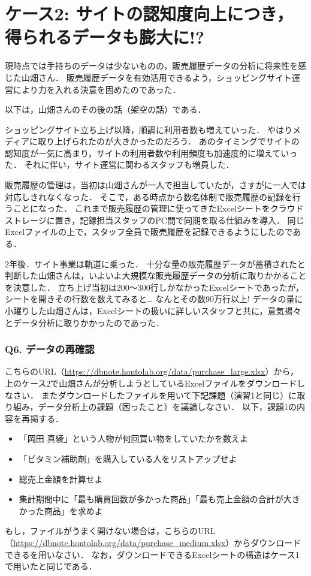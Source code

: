 \section{ケース2: サイトの認知度向上につき，得られるデータも膨大に!?}
現時点では手持ちのデータは少ないものの，販売履歴データの分析に将来性を感じた山畑さん．
販売履歴データを有効活用できるよう，ショッピングサイト運営により力を入れる決意を固めたのであった．

以下は，山畑さんのその後の話（架空の話）である．

\begin{framed}
ショッピングサイト立ち上げ以降，順調に利用者数も増えていった．
やはりメディアに取り上げられたのが大きかったのだろう．
あのタイミングでサイトの認知度が一気に高まり，サイトの利用者数や利用頻度も加速度的に増えていった．
それに伴い，サイト運営に関わるスタッフも増員した．

販売履歴の管理は，当初は山畑さんが一人で担当していたが，さすがに一人では対応しきれなくなった．
そこで，ある時点から数名体制で販売履歴の記録を行うことになった．
これまで販売履歴の管理に使ってきたExcelシートをクラウドストレージに置き，記録担当スタッフのPC間で同期を取る仕組みを導入．
同じExcelファイルの上で，スタッフ全員で販売履歴を記録できるようにしたのである．

2年後．サイト事業は軌道に乗った．
十分な量の販売履歴データが蓄積されたと判断した山畑さんは，いよいよ大規模な販売履歴データの分析に取りかかることを決意した．
立ち上げ当初は200〜300行しかなかったExcelシートであったが，シートを開きその行数を数えてみると…
なんとその数90万行以上!
データの量に小躍りした山畑さんは，Excelシートの扱いに詳しいスタッフと共に，意気揚々とデータ分析に取りかかったのであった．
\end{framed}


\subsubsection{Q6. データの再確認}
こちらのURL（\url{https://dbnote.hontolab.org/data/purchase\_large.xlsx}）から，上のケース2で山畑さんが分析しようとしているExcelファイルをダウンロードしなさい．
またダウンロードしたファイルを用いて下記課題（演習1と同じ）に取り組み，データ分析上の課題（困ったこと）を議論しなさい．
以下，課題1の内容を再掲する．
\begin{itemize}
    \item 「岡田 真綾」という人物が何回買い物をしていたかを数えよ
    \item 「ビタミン補助剤」を購入している人をリストアップせよ
    \item 総売上金額を計算せよ
    \item 集計期間中に「最も購買回数が多かった商品」「最も売上金額の合計が大きかった商品」を求めよ
    \end{itemize}
もし，ファイルがうまく開けない場合は，こちらのURL（\url{https://dbnote.hontolab.org/data/purchase\_medium.xlsx}）からダウンロードできるを用いなさい．
なお，ダウンロードできるExcelシートの構造はケース1で用いたと同じである．


